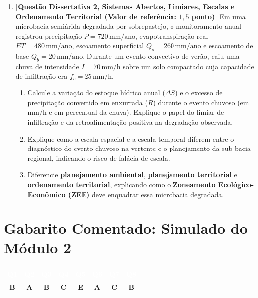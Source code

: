 \begin{enumerate}[leftmargin=1.8em, itemsep=6pt, resume]
  \item \textbf{[Questão Dissertativa 2, Sistemas Abertos, Limiares, Escalas e Ordenamento Territorial (Valor de referência: $1{,}5$ ponto)]}
  Em uma microbacia semiárida degradada por sobrepastejo, o monitoramento anual registrou precipitação $P = 720\,\text{mm/ano}$, evapotranspiração real $ET = 480\,\text{mm/ano}$, escoamento superficial $Q_s = 260\,\text{mm/ano}$ e escoamento de base $Q_b = 20\,\text{mm/ano}$. Durante um evento convectivo de verão, caiu uma chuva de intensidade $I = 70\,\text{mm/h}$ sobre um solo compactado cuja capacidade de infiltração era $f_c = 25\,\text{mm/h}$.
  \begin{enumerate}[label=(\alph*), leftmargin=1.8em, itemsep=2pt]
    \item Calcule a variação do estoque hídrico anual ($\Delta S$) e o excesso de precipitação convertido em enxurrada ($R$) durante o evento chuvoso (em $\text{mm/h}$ e em percentual da chuva). Explique o papel do limiar de infiltração e da retroalimentação positiva na degradação observada.
    \item Explique como a escala espacial e a escala temporal diferem entre o diagnóstico do evento chuvoso na vertente e o planejamento da sub-bacia regional, indicando o risco de falácia de escala.
    \item Diferencie \textbf{planejamento ambiental}, \textbf{planejamento territorial} e \textbf{ordenamento territorial}, explicando como o \textbf{Zoneamento Ecológico-Econômico (ZEE)} deve enquadrar essa microbacia degradada.
  \end{enumerate}
  \espacoResolucao[4.0cm]
\end{enumerate}

\clearpage
\section*{Gabarito Comentado: Simulado do Módulo 2}

\begin{center}
\renewcommand{\arraystretch}{1.2}
\small
\begin{tabularx}{\textwidth}{@{}c c c c c c c c@{}}
  \toprule
  \rowcolor{uefsNavy}
  \textcolor{white}{\bfseries Q1} & \textcolor{white}{\bfseries Q2} & \textcolor{white}{\bfseries Q3} & \textcolor{white}{\bfseries Q4} & \textcolor{white}{\bfseries Q5} & \textcolor{white}{\bfseries Q6} & \textcolor{white}{\bfseries Q7} & \textcolor{white}{\bfseries Q8} \\
  \midrule
  \textbf{B} & \textbf{A} & \textbf{B} & \textbf{C} & \textbf{E} & \textbf{A} & \textbf{C} & \textbf{B} \\
  \bottomrule
\end{tabularx}
\end{center}

